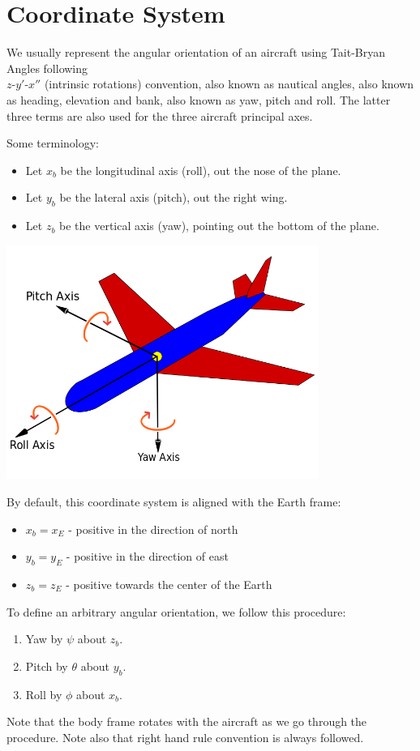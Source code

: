 \documentclass[12pt]{article}
\begin{document}
	\section{Coordinate System}
	
	We usually represent the angular orientation of an aircraft using Tait-Bryan Angles following \\
	$z$-$y'$-$x''$ (intrinsic rotations) convention, also known as nautical angles, 
	also known as heading, elevation and bank, also known as yaw, pitch and roll. 
	The latter three terms are also used for the three aircraft principal axes.
	
	Some terminology:
	\begin{itemize}
		\item Let $x_b$ be the longitudinal axis (roll), out the nose of the plane.
		\item Let $y_b$ be the lateral axis (pitch), out the right wing.
		\item Let $z_b$ be the vertical axis (yaw), pointing out the bottom of the plane.
	\end{itemize}
	
	\includegraphics[width=4in]{aircraft_axes.png}
	
	By default, this coordinate system is aligned with the Earth frame:
	\begin{itemize}
		\item $x_b = x_E$ - positive in the direction of north
		\item $y_b = y_E$ - positive in the direction of east
		\item $z_b = z_E$ - positive towards the center of the Earth
	\end{itemize}
	
	To define an arbitrary angular orientation, we follow this procedure:
	\begin{enumerate}
		\item Yaw by $\psi$ about $z_b$.
		\item Pitch by $\theta$ about $y_b$.
		\item Roll by $\phi$ about $x_b$.
	\end{enumerate}
	Note that the body frame rotates with the aircraft as we go through the procedure. 
	Note also that right hand rule convention is always followed.
	
\end{document}
